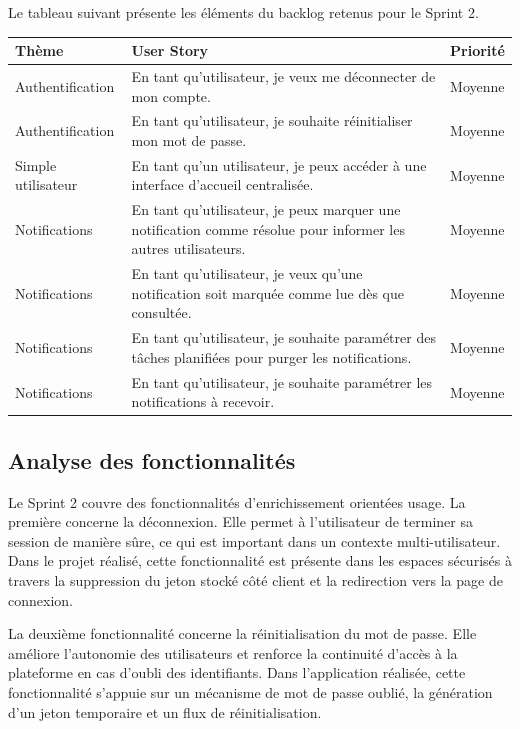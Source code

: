 \documentclass[12pt,a4paper]{report}
\begin{document}
Le tableau suivant présente les éléments du backlog retenus pour le Sprint 2.

\begin{longtable}{|>{\raggedright\arraybackslash}p{3.2cm}|>{\raggedright\arraybackslash}p{8.8cm}|>{\centering\arraybackslash}p{2.2cm}|}
\hline
\textbf{Thème} & \textbf{User Story} & \textbf{Priorité} \\
\hline
Authentification & En tant qu'utilisateur, je veux me déconnecter de mon compte. & Moyenne \\
\hline
Authentification & En tant qu'utilisateur, je souhaite réinitialiser mon mot de passe. & Moyenne \\
\hline
Simple utilisateur & En tant qu'un utilisateur, je peux accéder à une interface d'accueil centralisée. & Moyenne \\
\hline
Notifications & En tant qu'utilisateur, je peux marquer une notification comme résolue pour informer les autres utilisateurs. & Moyenne \\
\hline
Notifications & En tant qu'utilisateur, je veux qu'une notification soit marquée comme lue dès que consultée. & Moyenne \\
\hline
Notifications & En tant qu'utilisateur, je souhaite paramétrer des tâches planifiées pour purger les notifications. & Moyenne \\
\hline
Notifications & En tant qu'utilisateur, je souhaite paramétrer les notifications à recevoir. & Moyenne \\
\hline
\end{longtable}

\subsection{Analyse des fonctionnalités}
Le Sprint 2 couvre des fonctionnalités d'enrichissement orientées usage. La première concerne la déconnexion. Elle permet à l'utilisateur de terminer sa session de manière sûre, ce qui est important dans un contexte multi-utilisateur. Dans le projet réalisé, cette fonctionnalité est présente dans les espaces sécurisés à travers la suppression du jeton stocké côté client et la redirection vers la page de connexion.

La deuxième fonctionnalité concerne la réinitialisation du mot de passe. Elle améliore l'autonomie des utilisateurs et renforce la continuité d'accès à la plateforme en cas d'oubli des identifiants. Dans l'application réalisée, cette fonctionnalité s'appuie sur un mécanisme de mot de passe oublié, la génération d'un jeton temporaire et un flux de réinitialisation.
\end{document}
